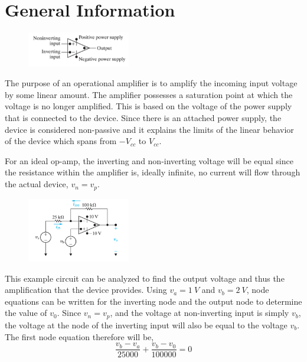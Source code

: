 \documentclass[12pt]{article}
\begin{document}
    \section*{General Information}
    \begin{figure}[h]
        \centering
        \includegraphics[width=0.4\textwidth]{Op-Amp.png}
    \end{figure}
    \par The purpose of an operational amplifier is to amplify the incoming
    input voltage by some linear amount. The amplifier possesses a saturation
    point at which the voltage is no longer amplified. This is based on the
    voltage of the power supply that is connected to the device. Since there is
    an attached power supply, the device is considered non-passive and it
    explains the limits of the linear behavior of the device which spans from
    $-V_{cc}$ to $V_{cc}$.
    \par For an ideal op-amp, the inverting and non-inverting voltage will be
    equal since the resistance within the amplifier is, ideally infinite, no
    current will flow through the actual device, $v_n = v_p$.
    \begin{figure}[h]
        \centering
        \includegraphics[width=0.4\textwidth]{Op-Amp Example Circuit.png}
    \end{figure}
    \par This example circuit can be analyzed to find the output voltage and
    thus the amplification that the device provides. Using $v_a = 1\ V$ and $v_b
    = 2\ V$, node equations can be written for the inverting node and the output
    node to determine the value of $v_0$. Since $v_n = v_p$, and the voltage at
    non-inverting input is simply $v_b$, the voltage at the node of the
    inverting input will also be equal to the voltage $v_b$. The first node
    equation therefore will be,
    \[
        \frac{v_b-v_a}{25000} + \frac{v_b-v_0}{100000} = 0
    \]
\end{document}
